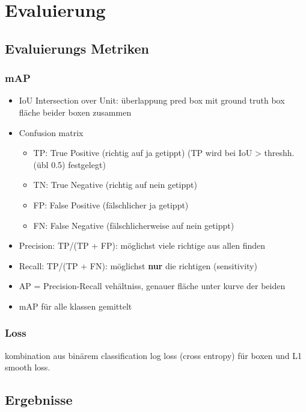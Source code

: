 \chapter{Evaluierung}\label{kap:eval}

\section{Evaluierungs Metriken}\label{sec:metricen}

\subsection*{mAP}
\begin{itemize}
    \item IoU Intersection over Unit: überlappung pred box mit ground truth box fläche beider boxen zusammen
    \item Confusion matrix
    \begin{itemize}
        \item TP: True Positive (richtig auf ja getippt) (TP wird bei IoU > threshh. (übl 0.5) festgelegt)
        \item TN: True Negative (richtig auf nein getippt)
        \item FP: False Positive (fälschlicher ja getippt)
        \item FN: False Negative (fälschlicherweise auf nein getippt)
    \end{itemize}
    \item Precision: TP/(TP + FP): möglichst viele richtige aus allen finden
    \item Recall: TP/(TP + FN): möglichst \textbf{nur} die richtigen (sensitivity)
    \item AP = Precision-Recall vehältniss, genauer fläche unter kurve der beiden
    \item mAP für alle klassen gemittelt
\end{itemize}

\subsection*{Loss}
kombination aus binärem classification log loss (cross entropy) für boxen und 
L1 smooth loss.



\section{Ergebnisse}\label{sec:results}

